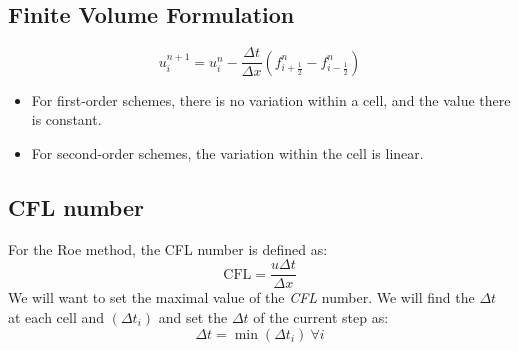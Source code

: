 \documentclass[11pt, a4paper]{article}
\begin{document}
\subsection{Finite Volume Formulation}
\begin{equation}
    u_i^{n+1}=u_i^n-\frac{\Delta t}{\Delta x}\left(f_{i+\frac{1}{2}}^n-f_{i-\frac{1}{2}}^n\right)
\end{equation}
\begin{itemize}
    \item For first-order schemes, there is no variation within a cell, and the value there is constant.
    \item For second-order schemes, the variation within the cell is linear. 
\end{itemize}

\subsection{CFL number}
For the Roe method, the CFL number is defined as:
\begin{equation}
    \mathrm{CFL}=\frac{u\Delta t}{\Delta x}
\end{equation}
We will want to set the maximal value of the \emph{CFL} number. We will find the $\Delta t$ at each cell and $\left(\Delta t_i\right)$ and set the $\Delta t$ of the current step as:
\begin{equation}
    \Delta t=\min\left(\Delta t_i\right)\ \forall i
\end{equation}
\end{document}
